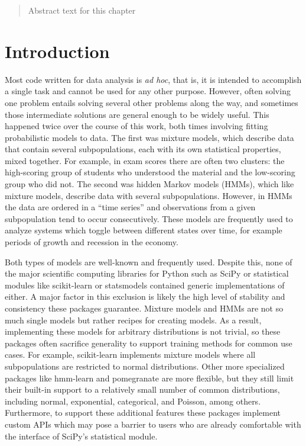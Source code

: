 \begin{abstract}
\noindent
Abstract text for this chapter
\end{abstract}

\section*{Introduction}
Most code written for data analysis is \textit{ad hoc}, that is, it is intended to accomplish a single task and cannot be used for any other purpose. However, often solving one problem entails solving several other problems along the way, and sometimes those intermediate solutions are general enough to be widely useful. This happened twice over the course of this work, both times involving fitting probabilistic models to data. The first was mixture models, which describe data that contain several subpopulations, each with its own statistical properties, mixed together. For example, in exam scores there are often two clusters: the high-scoring group of students who understood the material and the low-scoring group who did not. The second was hidden Markov models (HMMs), which like mixture models, describe data with several subpopulations. However, in HMMs the data are ordered in a ``time series'' and observations from a given subpopulation tend to occur consecutively. These models are frequently used to analyze systems which toggle between different states over time, for example periods of growth and recession in the economy.

Both types of models are well-known and frequently used. Despite this, none of the major scientific computing libraries for Python such as SciPy or statistical modules like scikit-learn or statsmodels contained generic implementations of either. A major factor in this exclusion is likely the high level of stability and consistency these packages guarantee. Mixture models and HMMs are not so much single models but rather recipes for creating models. As a result, implementing these models for arbitrary distributions is not trivial, so these packages often sacrifice generality to support training methods for common use cases. For example, scikit-learn implements mixture models where all subpopulations are restricted to normal distributions. Other more specialized packages like hmm-learn and pomegranate are more flexible, but they still limit their built-in support to a relatively small number of common distributions, including normal, exponential, categorical, and Poisson, among others. Furthermore, to support these additional features these packages implement custom APIs which may pose a barrier to users who are already comfortable with the interface of SciPy's statistical module.


